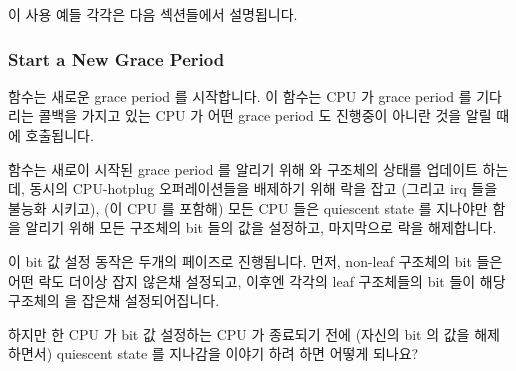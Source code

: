 이 사용 예들 각각은 다음 섹션들에서 설명됩니다.
\iffalse

Each of these use cases is described in the following sections.
\fi

\subsubsection{Start a New Grace Period}
\label{app:rcuimpl:rcutree:Start a New Grace Period}

 함수는 새로운 grace period 를 시작합니다.
이 함수는 CPU 가 grace period 를 기다리는 콜백을 가지고 있는 CPU 가 어떤 grace
period 도 진행중이 아니란 것을 알릴 때에 호출됩니다.

 함수는 새로이 시작된 grace period 를 알리기 위해
 와  구조체의 상태를 업데이트 하는데, 동시의
CPU-hotplug 오퍼레이션들을 배제하기 위해  락을 잡고 (그리고 irq
들을 불능화 시키고), (이 CPU 를 포함해) 모든 CPU 들은 quiescent state 를
지나야만 함을 알리기 위해 모든  구조체의 bit 들의 값을 설정하고,
마지막으로  락을 해제합니다.
\iffalse

The \co{rcu_start_gp()} function starts a new grace period.
This function is invoked when a CPU having callbacks waiting for a
grace period notices that no grace period is in progress.

The \co{rcu_start_gp()} function updates state in
the \co{rcu_state} and \co{rcu_data} structures
to note the newly started grace period,
acquires the \co{->onoff} lock (and disables irqs) to exclude
any concurrent CPU-hotplug operations,
sets the
bits in all of the \co{rcu_node} structures to indicate
that all CPUs (including this one) must pass through a quiescent
state,
and finally
releases the \co{->onoff} lock.
\fi

이 bit 값 설정 동작은 두개의 페이즈로 진행됩니다.
먼저, non-leaf  구조체의 bit 들은 어떤 락도 더이상 잡지 않은채
설정되고, 이후엔 각각의 leaf  구조체들의 bit 들이 해당 구조체의
 을 잡은채 설정되어집니다.
\iffalse

The bit-setting operation is carried out in two phases.
First, the non-leaf \co{rcu_node} structures' bits are set without
holding any additional locks, and then finally each leaf \co{rcu_node}
structure's bits are set in turn while holding that structure's
\co{->lock}.
\fi

\QuickQuiz{}
	하지만 한 CPU 가 bit 값 설정하는 CPU 가 종료되기 전에 (자신의 bit 의
	값을 해제하면서) quiescent state 를 지나감을 이야기 하려 하면 어떻게
	되나요?
	\iffalse

